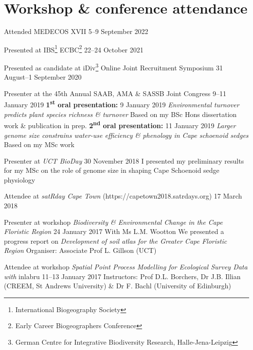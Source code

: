 \documentclass[10pt]{article}
\begin{document}
\section*{Workshop \& conference attendance} %

\begin{hangparas}{2em}{1}

Attended MEDECOS XVII                 \hfill {\small 5--9 September 2022} \break

Presented at IBS\footnote{International Biogeography Society}
ECBC\footnote{Early Career Biogeographers Conference}
                                      \hfill {\small 22--24 October 2021} \break

Presented as candidate at iDiv\footnote{German Centre for Integrative
Biodiversity Research, Halle-Jena-Leipzig} Online Joint Recruitment Symposium
                              \hfill {\small 31 August--1 September 2020} \break

Presenter at the 45th Annual SAAB, AMA \& SASSB Joint Congress
                                       \hfill {\small 9--11 January 2019} \break
\textbf{1\textsuperscript{st} oral presentation:}
                                           \hfill {\small 9 January 2019} \break
\textit{Environmental turnover predicts plant species richness \& turnover}
\break
Based on my BSc Hons dissertation work \& publication in prep. \break
\textbf{2\textsuperscript{nd} oral presentation:}
                                          \hfill {\small 11 January 2019} \break
\textit{Larger genome size constrains water-use efficiency \& phenology in 
Cape schoenoid sedges} \break
Based on my MSc work

Presenter at \textit{UCT BioDay}         \hfill {\small 30 November 2018} \break
I presented my preliminary results for my MSc on the role of genome size in 
shaping Cape Schoenoid sedge physiology

Attendee at \textit{satRday Cape Town} (https://capetown2018.satrdays.org)
                                                   \hfill {\small 17 March 2018}

Presenter at workshop \textit{Biodiversity \& Environmental Change in the Cape 
Floristic Region}                         \hfill {\small 24 January 2017} \break
With Ms L.M. Wootton \break
We presented a progress report on \textit{Development of soil atlas for the 
Greater Cape Floristic Region} \break
Organiser: Associate Prof L. Gillson (UCT)

Attendee at workshop \textit{Spatial Point Process Modelling for Ecological 
Survey Data with} inlabru             \hfill {\small 11--13 January 2017} \break
Instructors: Prof D.L. Borchers, Dr J.B. Illian (CREEM, St Andrews University) 
\& Dr F. Bachl (University of Edinburgh)

\hfill

\end{hangparas}
\end{document}
